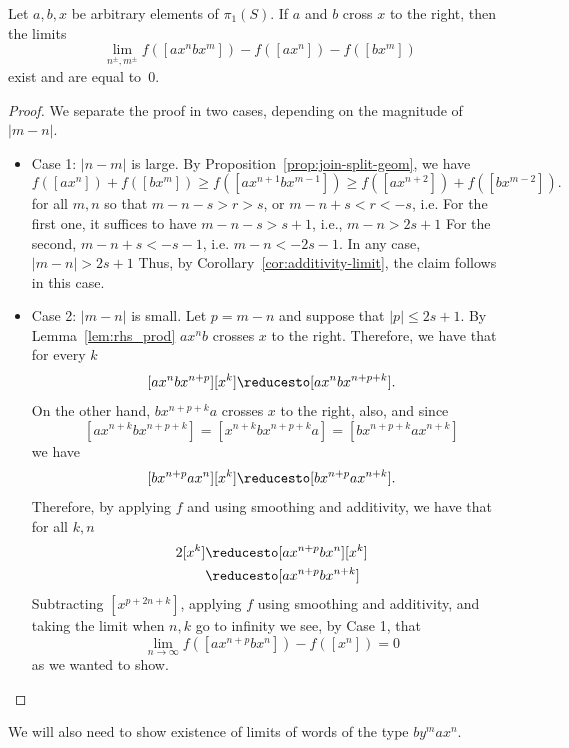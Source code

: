 \begin{proposition}\label{prop:join-split-alg}
Let $a,b,x$ be arbitrary elements of $\pi_1(S)$.
  If $a$ and $b$ cross $x$ to the right, then the limits
  \[
    \lim_{n^{\pm},m^{\pm}} f([a x^n b x^m]) - f([ax^n]) - f([bx^m])
  \]
  exist and are equal to~$0$.
\end{proposition}
\begin{proof}
We separate the proof in two cases, depending on the magnitude of $|m-n|$.
\begin{itemize}
    \item Case 1: $|n-m|$ is large.  By Proposition~\ref{prop:join-split-geom}, we have
  \[
    f([a x^n]) + f([b x^{m}]) \ge f([a x^{n+1} b x^{m-1}])
      \ge f([a x^{n+2}]) + f([b x^{m-2}]).
  \]
  for all $m,n$ so that $m-n -s >r > s$, or $m-n+s<r<-s$, i.e.
  For the first one, it suffices to have $m-n-s > s+1$, i.e., $m-n>2s+1$
  For the second, $m-n+s<-s-1$, i.e. $m-n<-2s-1$.
  In any case, $|m-n|>2s+1$
  Thus, by Corollary~\ref{cor:additivity-limit}, the claim follows in this case.
  \item Case 2: $|m-n|$ is small.  Let $p=m-n$ and suppose that $|p| \leq 2s+1$. By Lemma~\ref{lem:rhs_prod}  $ax^nb$ crosses $x$ to the right. Therefore, we have that for every $k$
  \[
  [ax^nbx^{n+p}] [x^k] \reducesto [ax^nbx^{n+p+k}].
  \]
  On the other hand, $bx^{n+p+k}a$ crosses $x$ to the right, also, and since
  \[
  [ax^{n+k}bx^{n+p+k}]=[x^{n+k}bx^{n+p+k}a]=[bx^{n+p+k}ax^{n+k}]
  \]
  we have
  \[
  [bx^{n+p}ax^{n}] [x^k] \reducesto [bx^{n+p}ax^{n+k}].
  \]  
  Therefore, by applying $f$ and using smoothing and additivity, we have that
  for all $k, n$
  \begin{align*}
  [ax^{n+p} bx^{n-k}] 2[x^k] & \reducesto  [ax^{n+p} bx^{n}] [x^k]  \\
  &\reducesto  [ax^{n+p} bx^{n+k}]
  \end{align*}
  Subtracting $[x^{p+2n+k}]$, applying $f$ using smoothing and additivity, and taking the limit when $n,k$ go to infinity we see, by Case 1, that
  \[
  \lim_{n \to \infty} f([ax^{n+p}bx^n])-f([x^n])=0
  \]  
  as we wanted to show.\qedhere
\end{itemize}
 \end{proof}
 
We will also need to show existence of limits of words of the type $by^m ax^n$.

